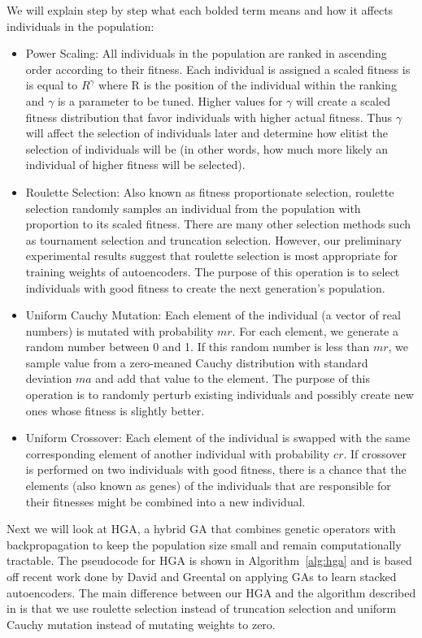 We will explain step by step what each bolded term means and how it affects individuals in the population:

\begin{itemize}
  \item Power Scaling: All individuals in the population are ranked in ascending order according to their fitness. Each individual is assigned a scaled fitness is is equal to $R^{\gamma}$ where R is the position of the individual within the ranking and $\gamma$ is a parameter to be tuned. Higher values for $\gamma$ will create a scaled fitness distribution that favor individuals with higher actual fitness. Thus $\gamma$ will affect the selection of individuals later and determine how elitist the selection of individuals will be (in other words, how much more likely an individual of higher fitness will be selected).
  \item Roulette Selection: Also known as fitness proportionate selection, roulette selection randomly samples an individual from the population with proportion to its scaled fitness. There are many other selection methods such as tournament selection and truncation selection. However, our preliminary experimental results suggest that roulette selection is most appropriate for training weights of autoencoders. The purpose of this operation is to select individuals with good fitness to create the next generation's population. 
  \item Uniform Cauchy Mutation: Each element of the individual (a vector of real numbers) is mutated with probability $mr$. For each element, we generate a random number between 0 and 1. If this random number is less than $mr$, we sample value from a zero-meaned Cauchy distribution with standard deviation $ma$ and add that value to the element. The purpose of this operation is to randomly perturb existing individuals and possibly create new ones whose fitness is slightly better. 
  \item Uniform Crossover: Each element of the individual is swapped with the same corresponding element of another individual with probability $cr$. If crossover is performed on two individuals with good fitness, there is a chance that the elements (also known as genes) of the individuals that are responsible for their fitnesses might be combined into a new individual. 
\end{itemize}

Next we will look at HGA, a hybrid GA that combines genetic operators with backpropagation to keep the population size small and remain computationally tractable. The pseudocode for HGA is shown in Algorithm~\ref{alg:hga} and is based off recent work done by David and Greental \cite{david2014genetic} on applying GAs to learn stacked autoencoders. The main difference between our HGA and the algorithm described in \cite{david2014genetic} is that we use roulette selection instead of truncation selection and uniform Cauchy mutation instead of mutating weights to zero. 

